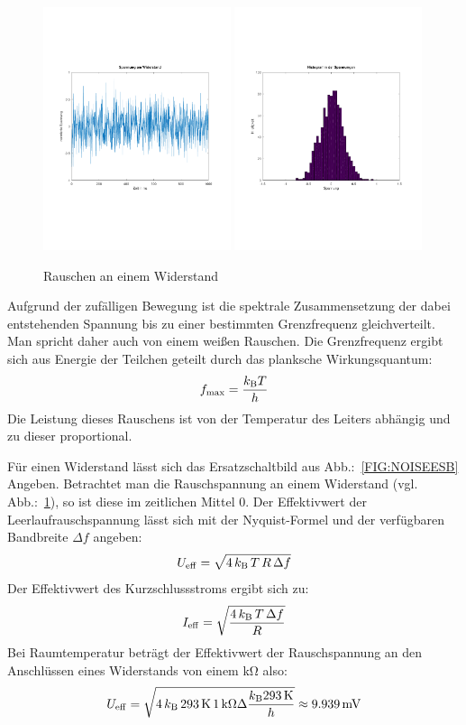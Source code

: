\begin{figure}
  \centering
  \includegraphics[clip, width=0.49\textwidth]
  {./../common/Simulation/rauschen/spannung.pdf}
  \includegraphics[clip, width=0.49\textwidth]
  {./../common/Simulation/rauschen/haeufigkeit.pdf}
  \caption{Rauschen an einem Widerstand}\label{FIG:NOISE}
\end{figure}
Aufgrund der zufälligen Bewegung ist die spektrale Zusammensetzung der dabei
entstehenden Spannung bis zu einer bestimmten Grenzfrequenz gleichverteilt.
Man spricht daher auch von einem weißen Rauschen.
Die Grenzfrequenz ergibt sich aus Energie der Teilchen geteilt durch das 
planksche Wirkungsquantum:
\[f_{\max} = \frac{k_{\rm B} T}{h}\]
Die Leistung dieses Rauschens ist von der Temperatur des Leiters abhängig und
zu dieser proportional.

Für einen Widerstand lässt sich das Ersatzschaltbild aus 
Abb.:~\ref{FIG:NOISEESB} Angeben.
Betrachtet man die Rauschspannung an einem Widerstand 
(vgl. Abb.:~\ref{FIG:NOISE}), so ist diese im zeitlichen Mittel 0.
Der Effektivwert der Leerlaufrauschspannung lässt sich mit der Nyquist-Formel 
und der verfügbaren Bandbreite $\Delta f$ angeben\cite[Nyquist]{Art:NYQUIST}:
\[U_{\rm eff} = \sqrt{4\, k_{\rm B}\, T\, R\, \Delta f}\]
Der Effektivwert des Kurzschlussstroms ergibt sich zu:
\[I_{\rm eff} = \sqrt{\frac{4\,k_{\rm B}\, T\, \Delta f}{R}}\]
Bei Raumtemperatur beträgt der Effektivwert der Rauschspannung an den 
Anschlüssen eines Widerstands von einem \si{\kilo\ohm} also:
\[U_{\rm eff} = 
\sqrt{4\, k_{\rm B}\, 293\,\si{\kelvin}\, 1\,\si{\kilo\ohm} \Delta 
\frac{k_{\rm B} 293\,\si{\kelvin}}{h}} \approx 9.939\,\si{\milli\volt}\]

